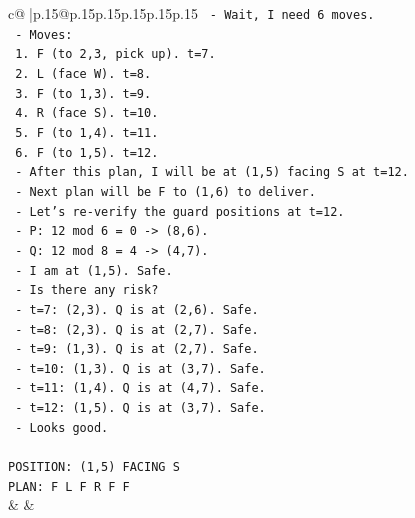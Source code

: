 \documentclass{article}
\begin{document}
{\begin{supertabular}{c@{$\;$}|p{.15\linewidth}@{}p{.15\linewidth}p{.15\linewidth}p{.15\linewidth}p{.15\linewidth}p{.15\linewidth}}
{{{\texttt{   {-} Wait, I need 6 moves.} \\
\texttt{   {-} Moves:} \\
\texttt{     1. F (to 2,3, pick up). t=7.} \\
\texttt{     2. L (face W). t=8.} \\
\texttt{     3. F (to 1,3). t=9.} \\
\texttt{     4. R (face S). t=10.} \\
\texttt{     5. F (to 1,4). t=11.} \\
\texttt{     6. F (to 1,5). t=12.} \\
\texttt{   {-} After this plan, I will be at (1,5) facing S at t=12.} \\
\texttt{   {-} Next plan will be F to (1,6) to deliver.} \\
\texttt{   {-} Let's re{-}verify the guard positions at t=12.} \\
\texttt{     {-} P: 12 mod 6 = 0 {-}> (8,6).} \\
\texttt{     {-} Q: 12 mod 8 = 4 {-}> (4,7).} \\
\texttt{     {-} I am at (1,5). Safe.} \\
\texttt{   {-} Is there any risk?} \\
\texttt{     {-} t=7: (2,3). Q is at (2,6). Safe.} \\
\texttt{     {-} t=8: (2,3). Q is at (2,7). Safe.} \\
\texttt{     {-} t=9: (1,3). Q is at (2,7). Safe.} \\
\texttt{     {-} t=10: (1,3). Q is at (3,7). Safe.} \\
\texttt{     {-} t=11: (1,4). Q is at (4,7). Safe.} \\
\texttt{     {-} t=12: (1,5). Q is at (3,7). Safe.} \\
\texttt{   {-} Looks good.} \\
\\ 
\texttt{POSITION: (1,5) FACING S} \\
\texttt{PLAN: F L F R F F} \\
            }
        }
    }
    & & \\ \\


\end{supertabular}}
\end{document}
